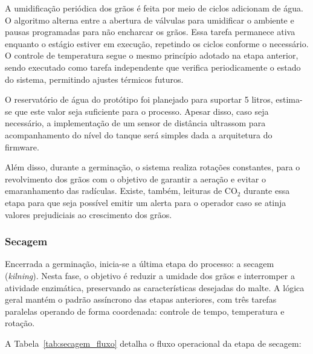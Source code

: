 A umidificação periódica dos grãos é feita por meio de ciclos adicionam de água. O algoritmo alterna entre a abertura de válvulas para umidificar o ambiente e pausas programadas para não encharcar os grãos. Essa tarefa permanece ativa enquanto o estágio estiver em execução, repetindo os ciclos conforme o necessário. O controle de temperatura segue o mesmo princípio adotado na etapa anterior, sendo executado como tarefa independente que verifica periodicamente o estado do sistema, permitindo ajustes térmicos futuros.

O reservatório de água do protótipo foi planejado para suportar 5 litros, estima-se que este valor seja suficiente para o processo. Apesar disso, caso seja necessário, a implementação de um sensor de distância ultrassom para acompanhamento do nível do tanque será simples dada a arquitetura do firmware. 

Além disso, durante a germinação, o sistema realiza rotações constantes, para o revolvimento dos grãos com o objetivo de garantir a aeração e evitar o emaranhamento das radículas. Existe, também, leituras de CO$_{2}$ durante essa etapa para que seja possível emitir um alerta para o operador caso se atinja valores prejudiciais ao crescimento dos grãos.

\subsubsection{Secagem}

Encerrada a germinação, inicia-se a última etapa do processo: a secagem (\textit{kilning}). Nesta fase, o objetivo é reduzir a umidade dos grãos e interromper a atividade enzimática, preservando as características desejadas do malte. A lógica geral mantém o padrão assíncrono das etapas anteriores, com três tarefas paralelas operando de forma coordenada: controle de tempo, temperatura e rotação.

A Tabela~\ref{tab:secagem_fluxo} detalha o fluxo operacional da etapa de secagem:

